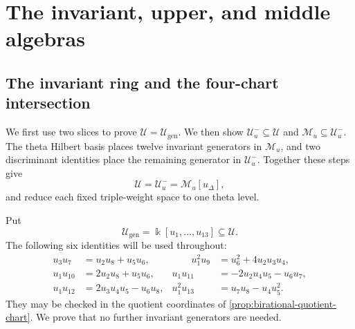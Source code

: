 \documentclass[11pt,reqno]{amsart}
\numberwithin{equation}{section}
\theoremstyle{remark}
\newcommand{\kk}{\Bbbk}
\newcommand{\UR}{\mathscr U}
\newcommand{\Uneg}{\mathcal U_u^{-}}
\newcommand{\Mu}{\mathcal M_u}
\newcommand{\Ugen}{\mathscr U_{\mathrm{gen}}}
\newcommand{\udisc}{u_{\Delta}}
\begin{document}
\section{The invariant, upper, and middle algebras}
\label{sec:ring-equalities}

\subsection{The invariant ring and the four-chart intersection}
\label{subsec:invariant-upper}

We first use two slices to prove $\UR=\Ugen$.  We then show
$\Uneg\subseteq\UR$ and $\Mu\subseteq\Uneg$.  The theta Hilbert
basis places twelve invariant generators in $\Mu$, and two discriminant
identities place the remaining generator in $\Uneg$.  Together these
steps give
\[ \UR=\Uneg=\Mu[\udisc], \]
and reduce each fixed triple-weight space to one theta level.

Put
\[ \Ugen=\kk[u_1,\ldots,u_{13}]\subseteq\UR. \]
The following six identities will be used throughout:
\begin{equation}
\label{eq:basic-relations}
 \begin{alignedat}{2}
 u_3u_7&=u_2u_8+u_5u_6,
 &\qquad u_1^2u_9&=u_6^2+4u_2u_3u_4,\\
 u_1u_{10}&=2u_2u_8+u_5u_6,
 &u_1u_{11}&=-2u_2u_4u_5-u_6u_7,\\
 u_1u_{12}&=2u_3u_4u_5-u_6u_8,
 &u_1^2u_{13}&=u_7u_8-u_4u_5^2.
 \end{alignedat}
\end{equation}
They may be checked in the quotient coordinates of
\cref{prop:birational-quotient-chart}.  We prove that no further invariant
generators are needed.
\end{document}
